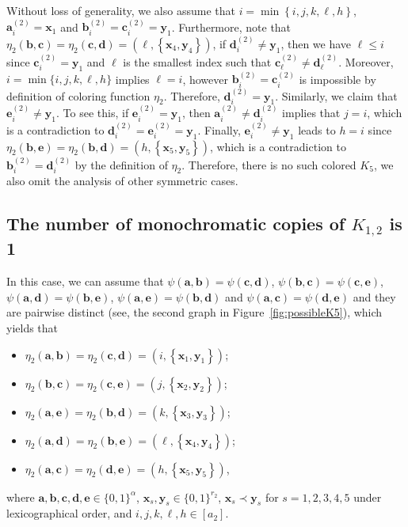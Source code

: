 \documentclass[11pt]{article}
\theoremstyle{definition}
\newcommand{\aaa}{\boldsymbol{a}}
\newcommand{\bb}{\boldsymbol{b}}
\newcommand{\cc}{\boldsymbol{c}}
\newcommand{\dd}{\boldsymbol{d}}
\newcommand{\ee}{\boldsymbol{e}}
\begin{document}
Without loss of generality, we also assume that $i=\min\left\{i,j,k,\ell,h\right\}$, $\boldsymbol{a}_i^{(2)}=\boldsymbol{x}_{1}$ and 
 $\boldsymbol{b}_i^{(2)}=\boldsymbol{c}_i^{(2)}=\boldsymbol{y}_{1}$. Furthermore, note that $\eta_{2}(\bb,\cc)=\eta_{2}(\cc,\dd)=(\ell,\left\{\boldsymbol{x}_{4},\boldsymbol{y}_{4}\right\})$, if $\boldsymbol{d}_i^{(2)}\neq \boldsymbol{y}_{1}$, then we have $\ell\le i$ since $\cc_{i}^{(2)}=\boldsymbol{y}_{1}$ and $\ell$ is the smallest index such that $\cc_{\ell}^{(2)}\neq\dd_{\ell}^{(2)}$. Moreover, $i=\min\{i,j,k,\ell,h\}$ implies $\ell=i$, however $\boldsymbol{b}_{i}^{(2)}=\boldsymbol{c}_{i}^{(2)}$ is impossible by definition of coloring function $\eta_{2}$. Therefore, $\dd_{i}^{(2)}=\boldsymbol{y}_{1}$. Similarly, we claim that $\ee_{i}^{(2)}\neq \boldsymbol{y}_{1}$. To see this, if $\ee_{i}^{(2)}= \boldsymbol{y}_{1}$, then $\aaa_{i}^{(2)}\neq \dd_{i}^{(2)}$ implies that $j=i$, which is a contradiction to $\dd_{i}^{(2)}=\ee_{i}^{(2)}= \boldsymbol{y}_{1}$. Finally, $\ee_{i}^{(2)}\neq\boldsymbol{y}_{1}$ leads to $h=i$ since $\eta_{2}(\bb,\ee)=\eta_{2}(\bb,\dd)=(h,\left\{\boldsymbol{x}_{5},\boldsymbol{y}_{5}\right\})$, which is a contradiction to $\boldsymbol{b}_{i}^{(2)}=\dd_{i}^{(2)}$ by the definition of $\eta_{2}$. Therefore, there is no such colored $K_{5}$, we also omit the analysis of other symmetric cases.

\subsection{The number of monochromatic copies of $K_{1,2}$ is 1}\label{subsubsec:Star1}

 In this case, we can assume that $\psi(\aaa,\bb)=\psi(\cc,\dd)$, $\psi(\bb,\cc)=\psi(\cc,\ee)$, $\psi(\aaa,\dd)=\psi(\bb,\ee)$, $\psi(\aaa,\ee)=\psi(\bb,\dd)$ and $\psi(\aaa,\cc)=\psi(\dd,\ee)$ and they are pairwise distinct (see, the second graph in Figure~\ref{fig:possibleK5}), which yields that

\begin{itemize}
    \item $\eta_{2}(\aaa,\bb)=\eta_{2}(\cc,\dd)=(i,\left\{\boldsymbol{x}_{1},\boldsymbol{y}_{1}\right\})$;
    \item $\eta_{2}(\bb,\cc)=\eta_{2}(\cc,\ee)=(j,\left\{\boldsymbol{x}_{2},\boldsymbol{y}_{2}\right\})$;
    \item $\eta_{2}(\aaa,\ee)=\eta_{2}(\bb,\dd)=(k,\left\{\boldsymbol{x}_{3},\boldsymbol{y}_{3}\right\})$;
    \item $\eta_{2}(\aaa,\dd)=\eta_{2}(\bb,\ee)=(\ell,\left\{\boldsymbol{x}_{4},\boldsymbol{y}_{4}\right\})$;
    \item $\eta_{2}(\aaa,\cc)=\eta_{2}(\dd,\ee)=(h,\left\{\boldsymbol{x}_{5},\boldsymbol{y}_{5}\right\})$,
\end{itemize}
where $\boldsymbol{a},\bb,\cc,\dd,\ee\in\{0,1\}^{\alpha}$, $\boldsymbol{x}_{s},\boldsymbol{y}_{s}\in\{0,1\}^{r_{2}}$, $\boldsymbol{x}_{s}\prec\boldsymbol{y}_{s}$ for $s=1,2,3,4,5$ under lexicographical order, and $i,j,k,\ell,h\in [a_{2}]$.
\end{document}

